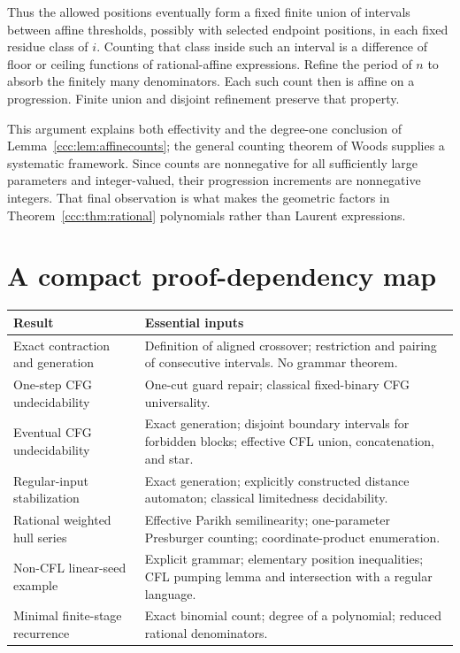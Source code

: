\documentclass[11pt,letterpaper]{article}
\theoremstyle{definition}
\theoremstyle{remark}
\begin{document}
Thus the allowed positions eventually form a fixed finite union of intervals
between affine thresholds, possibly with selected endpoint positions, in each
fixed residue class of $i$. Counting that class inside such an interval is a
difference of floor or ceiling functions of rational-affine expressions.
Refine the period of $n$ to absorb the finitely many denominators. Each such
count then is affine on a progression. Finite union and disjoint refinement
preserve that property.

This argument explains both effectivity and the degree-one conclusion of
Lemma~\ref{ccc:lem:affinecounts}; the general counting theorem of Woods supplies a
systematic framework. Since counts are nonnegative for all sufficiently large
parameters and integer-valued, their progression increments are nonnegative
integers. That final observation is what makes the geometric factors in
Theorem~\ref{ccc:thm:rational} polynomials rather than Laurent expressions.

\section{A compact proof-dependency map}\label{ccc:app:dependencies}

\begin{center}\small
\begin{tabular}{@{}p{}p{}@{}}
\toprule
\textbf{Result} & \textbf{Essential inputs}\\
\midrule
Exact contraction and generation &
Definition of aligned crossover; restriction and pairing of consecutive
intervals. No grammar theorem.\\[3pt]
One-step CFG undecidability &
One-cut guard repair; classical fixed-binary CFG universality.\\[3pt]
Eventual CFG undecidability &
Exact generation; disjoint boundary intervals for forbidden blocks;
effective CFL union, concatenation, and star.\\[3pt]
Regular-input stabilization &
Exact generation; explicitly constructed distance automaton; classical
limitedness decidability.\\[3pt]
Rational weighted hull series &
Effective Parikh semilinearity; one-parameter Presburger counting;
coordinate-product enumeration.\\[3pt]
Non-CFL linear-seed example &
Explicit grammar; elementary position inequalities; CFL pumping lemma and
intersection with a regular language.\\[3pt]
Minimal finite-stage recurrence &
Exact binomial count; degree of a polynomial; reduced rational denominators.\\
\bottomrule
\end{tabular}
\end{center}
\end{document}
